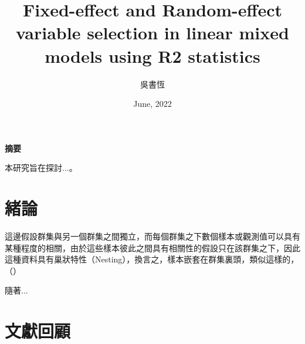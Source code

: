 
  
\title{\textbf{Fixed-effect and Random-effect variable selection in linear mixed models using R2 statistics}}
\author{吳書恆}
\date{June, 2022}

\fontsize{12}{2.2em}\selectfont

{\let\newpage\relax\maketitle}
\thispagestyle{empty}
\newpage 


{\large \textbf{摘要}}
\par
本研究旨在探討...。
\newpage
\tableofcontents
\newpage 
\renewcommand{\numberline}[1]{\loflabel~#1\hspace*{1em}}
\listoffigures
\newpage 
\renewcommand{\numberline}[1]{\lotlabel~#1\hspace*{1em}}
\listoftables 
\newpage 
 
\section{緒論}
這邊假設群集與另一個群集之間獨立，而每個群集之下數個樣本或觀測值可以具有某種程度的相關，由於這些樣本彼此之間具有相關性的假設只在該群集之下，因此這種資料具有巢狀特性（Nesting），換言之，樣本嵌套在群集裏頭，類似這樣的，（\cite{link1995social}）\par
隨著...




\newpage 
\section{文獻回顧}
